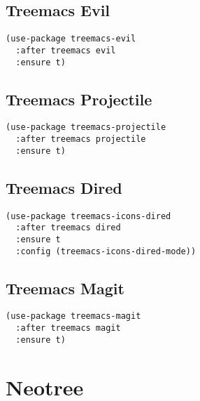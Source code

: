 \documentclass[11pt]{article}
\begin{document}
\subsection*{Treemacs Evil}
\label{sec:orgd0de917}
\begin{verbatim}
(use-package treemacs-evil
  :after treemacs evil
  :ensure t)
\end{verbatim}

\subsection*{Treemacs Projectile}
\label{sec:org1a9efa2}
\begin{verbatim}
(use-package treemacs-projectile
  :after treemacs projectile
  :ensure t)
\end{verbatim}

\subsection*{Treemacs Dired}
\label{sec:org35c25fc}
\begin{verbatim}
(use-package treemacs-icons-dired
  :after treemacs dired
  :ensure t
  :config (treemacs-icons-dired-mode))
\end{verbatim}

\subsection*{Treemacs Magit}
\label{sec:org128633e}
\begin{verbatim}
(use-package treemacs-magit
  :after treemacs magit
  :ensure t)
\end{verbatim}

\section*{Neotree}
\label{sec:orgeebc7e1}
\end{document}
